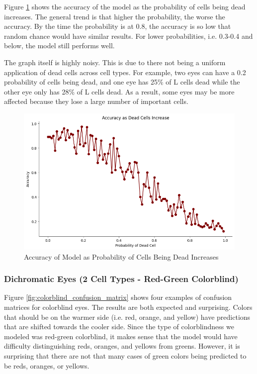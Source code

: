 \documentclass[titlepage]{article}
\begin{document}
Figure \ref{fig:dead_cell_accuracy} shows the accuracy of the model as the probability of cells being dead increases. The general trend is that higher the probability, the worse the accuracy. By the time the probability is at 0.8, the accuracy is so low that random chance would have similar results. For lower probabilities, i.e. 0.3-0.4 and below, the model still performs well.

\bigskip

The graph itself is highly noisy. This is due to there not being a uniform application of dead cells across cell types. For example, two eyes can have a 0.2 probability of cells being dead, and one eye has 25\% of L cells dead while the other eye only has 28\% of L cells dead. As a result, some eyes may be more affected because they lose a large number of important cells. 

\begin{figure}[H]
    \centering
    \includegraphics[width=\textwidth]{figs/dead_cell_accuracy.png}
    \caption{Accuracy of Model as Probability of Cells Being Dead Increases}
    \label{fig:dead_cell_accuracy}
\end{figure}

\subsubsection{Dichromatic Eyes (2 Cell Types - Red-Green Colorblind)}

Figure \ref{fig:colorblind_confusion_matrix} shows four examples of confusion matrices for colorblind eyes. The results are both expected and surprising. Colors that should be on the warmer side (i.e. red, orange, and yellow) have predictions that are shifted towards the cooler side. Since the type of colorblindness we modeled was red-green colorblind, it makes sense that the model would have difficulty distinguishing reds, oranges, and yellows from greens. However, it is surprising that there are not that many cases of green colors being predicted to be reds, oranges, or yellows.
\end{document}
